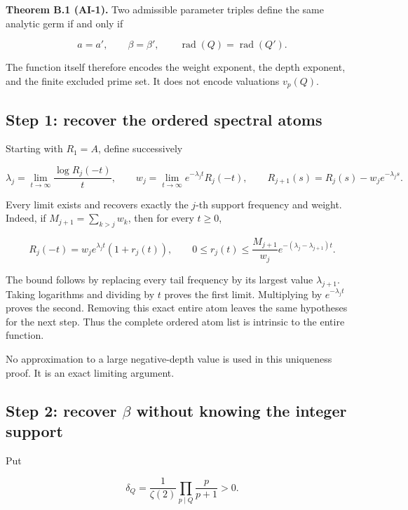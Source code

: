 \textbf{Theorem B.1 (AI-1).} Two admissible parameter triples define the same
analytic germ if and only if

\[
 a=a',\qquad \beta=\beta',\qquad
 \operatorname{rad}(Q)=\operatorname{rad}(Q').
\]

The function itself therefore encodes the weight exponent, the depth
exponent, and the finite excluded prime set. It does not encode
valuations \(v_p(Q)\).

\hypertarget{step-1-recover-the-ordered-spectral-atoms}{%
\subsection{Step 1: recover the ordered spectral
atoms}\label{step-1-recover-the-ordered-spectral-atoms}}

Starting with \(R_1=A\), define successively

\[
 \lambda_j=\lim_{t\to\infty}\frac{\log R_j(-t)}t,
 \qquad
 w_j=\lim_{t\to\infty}e^{-\lambda_jt}R_j(-t),
 \qquad
 R_{j+1}(s)=R_j(s)-w_je^{-\lambda_js}.
\]

Every limit exists and recovers exactly the \(j\)-th support frequency
and weight. Indeed, if \(M_{j+1}=\sum_{k>j}w_k\), then for every
\(t\ge0\),

\[
 R_j(-t)=w_je^{\lambda_jt}(1+r_j(t)),\qquad
 0\le r_j(t)\le\frac{M_{j+1}}{w_j}
                    e^{-(\lambda_j-\lambda_{j+1})t}.
\]

The bound follows by replacing every tail frequency by its largest value
\(\lambda_{j+1}\). Taking logarithms and dividing by \(t\) proves the
first limit. Multiplying by \(e^{-\lambda_jt}\) proves the second.
Removing this exact entire atom leaves the same hypotheses for the next
step. Thus the complete ordered atom list is intrinsic to the entire
function.

No approximation to a large negative-depth value is used in this
uniqueness proof. It is an exact limiting argument.

\hypertarget{step-2-recover-beta-without-knowing-the-integer-support}{%
\subsection{\texorpdfstring{Step 2: recover \(\beta\) without knowing
the integer
support}{Step 2: recover \textbackslash beta without knowing the integer support}}\label{step-2-recover-beta-without-knowing-the-integer-support}}

Put

\[
 \delta_Q=\frac1{\zeta(2)}\prod_{p\mid Q}\frac{p}{p+1}>0.
\]


